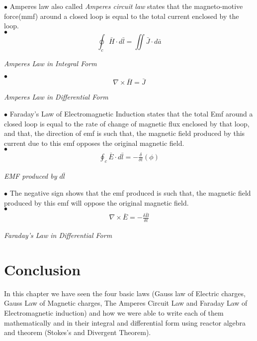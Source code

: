 $ \bullet $ Amperes law also called \emph{Amperes circuit law} states that the magneto-motive force(mmf) around a closed loop is equal to the total current enclosed by the loop.\\

$ \bullet $ \begin{equation*}
\oint_c\bar{H} \cdot d\bar{l} = \iint\bar{J} \cdot d\bar{a}
\end{equation*}
\begin{center}
	\emph{Amperes Law in Integral Form}
\end{center} 

$ \bullet $ \begin{equation*}
\boxed{\nabla \times \bar{H} = \bar{J}}
\end{equation*}
\begin{center}
	\emph{Amperes Law in Differential Form}
\end{center}

$ \bullet $ Faraday's Law of Electromagnetic Induction states that the total Emf around a closed loop is equal to the rate of change of magnetic flux enclosed by that loop, and that, the direction of emf is such that, the magnetic field produced by this current due to this emf opposes the original magnetic field. \\

$ \bullet $ \begin{align*}
\oint_c\bar{E} \cdot d\bar{l} = -\frac{\delta}{\delta t}(\phi)
\end{align*}
\begin{center}
	\emph{EMF produced by $d\bar{l}$}
\end{center} 
	
$ \bullet $ The negative sign shows that the emf produced is such that, the magnetic field produced by this emf will oppose the original magnetic field. \\

$ \bullet $ 
\begin{align*}
\nabla \times \bar{E} = -\frac{\delta \bar{B}}{\delta t}
\end{align*}
\begin{center}
	\emph{Faraday's Law in Differential Form}
\end{center}

	
	\section{Conclusion}
	In this chapter we have seen the four basic laws (Gauss law of Electric charges, Gauss Law of Magnetic charges, The Amperes Circuit Law and Faraday Law of Electromagnetic induction) and how we were able to write each of them mathematically and in their integral and differential form using reactor algebra and theorem (Stokes's and Divergent Theorem).\\